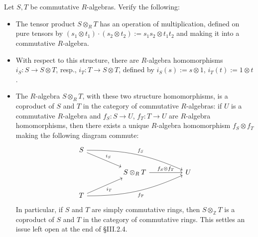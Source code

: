 \documentclass[../../master.tex]{subfiles}
\begin{document}
\begin{problem}
    Let $S, T$ be commutative $R$-algebras.
    Verify the following:
    \begin{itemize}
        \item The tensor product $S \otimes_R T$ has an operation of multiplication, defined on pure tensors by $(s_1 \otimes t_1) \cdot (s_2 \otimes t_2) := s_1 s_2 \otimes t_1 t_2$ and making it into a commutative $R$-algebra.
        \item With respect to this structure, there are $R$-algebra homomorphisms $i_S : S \to S \otimes T$, resp., $i_T : T \to S \otimes T$, defined by $i_S(s) := s \otimes 1$, $i_T(t) := 1 \otimes t$.
        \item The $R$-algebra $S \otimes_R T$, with these two structure homomorphisms, is a coproduct of $S$ and $T$ in the category of commutative $R$-algebras:
            if $U$ is a commutative $R$-algebra and $f_S : S \to U$, $f_T : T \to U$ are $R$-algebra homomorphisms, then there exists a unique $R$-algebra homomorphism $f_S \otimes f_T$ making the following diagram commute:
            \[
            \begin{tikzcd}
                S \\
                && {S \otimes_R T} && U \\
                T
                \arrow["{f_S \otimes f_T}", from=2-3, to=2-5]
                \arrow["{i_T}"', from=3-1, to=2-3]
                \arrow["{i_S}", from=1-1, to=2-3]
                \arrow["{f_S}", bend left=12, from=1-1, to=2-5]
                \arrow["{f_T}"', bend right=12, from=3-1, to=2-5]
            \end{tikzcd}
            \]
            In particular, if $S$ and $T$ are simply commutative rings, then $S \otimes_\mathbb{Z} T$ is a coproduct of $S$ and $T$ in the category of commutative rings.
            This settles an issue left open at the end of \S III.2.4.
    \end{itemize}
\end{problem}
\end{document}
